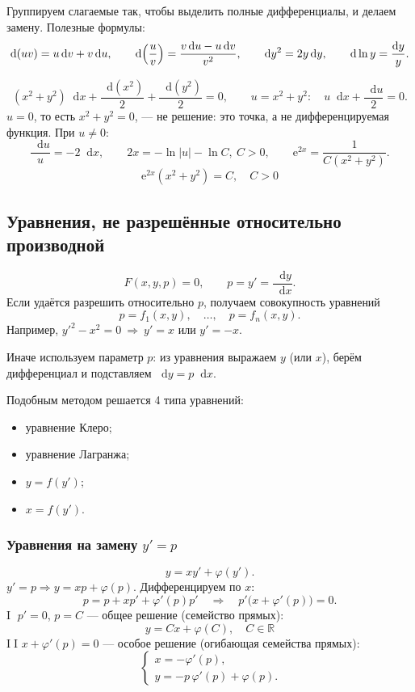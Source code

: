 \documentclass[12pt,a4paper]{article}
\numberwithin{equation}{section}
\newcommand{\R}{\mathbb{R}}
\newcommand{\e}{\mathrm{e}}
\newcommand{\dd}{\mathop{}\!\mathrm{d}}
\begin{document}
\label{box:type10}
\begin{definitionHSE}
Группируем слагаемые так, чтобы выделить полные дифференциалы, и делаем замену. Полезные формулы:
\[
\dd(uv)=u\dd v+v\dd u,\qquad
\dd\Bigl(\frac uv\Bigr)=\frac{v\dd u-u\dd v}{v^2},\qquad
\dd y^2=2y\dd y,\qquad
\dd\ln y=\frac{\dd y}{y}.
\]
\end{definitionHSE}

\begin{exampleHSE}[\((x^2+y^2+x)\dd x+y\dd y=0\)]
\[
(x^2+y^2)\dd x+\frac{\dd(x^2)}{2}+\frac{\dd(y^2)}{2}=0,\qquad u=x^2+y^2:\quad u\dd x+\frac{\dd u}{2}=0.
\]
$u=0$, то есть $x^2+y^2=0$, --- не решение: это точка, а не дифференцируемая функция. При $u\neq0$:
\[
\frac{\dd u}{u}=-2\dd x,\qquad 2x=-\ln|u|-\ln C,\ C>0,\qquad \e^{2x}=\frac{1}{C(x^2+y^2)}.
\]
\[
\boxed{\ \e^{2x}(x^2+y^2)=C,\quad C>0\ }
\]
\end{exampleHSE}

\subsection{Уравнения, не разрешённые относительно производной}

\[
F(x,y,p)=0,\qquad p=y'=\frac{\dd y}{\dd x}.
\]
Если удаётся разрешить относительно $p$, получаем совокупность уравнений
\[
p=f_1(x,y),\quad\ldots,\quad p=f_n(x,y).
\]
Например, $y'^2-x^2=0\ \Longrightarrow\ y'=x$ или $y'=-x$.

Иначе используем параметр $p$: из уравнения выражаем $y$ (или $x$), берём дифференциал и подставляем $\dd y=p\dd x$.

Подобным методом решается 4 типа уравнений:
\begin{itemize}
\item уравнение Клеро;
\item уравнение Лагранжа;
\item \(y=f(y')\);
\item \(x=f(y')\).
\end{itemize}

\subsubsection{Уравнения на замену \texorpdfstring{\(y'=p\)}{y'=p}}

\label{box:type11}
\begin{definitionHSE}
\[
y=xy'+\varphi(y').
\]
$\boxed{y'=p}\Rightarrow y=xp+\varphi(p)$. Дифференцируем по $x$:
\[
p=p+xp'+\varphi'(p)p'\quad\Longrightarrow\quad p'\bigl(x+\varphi'(p)\bigr)=0.
\]
\textcircled{\small I} $p'=0$, $p=C$ --- общее решение (семейство прямых):
\[
\boxed{\ y=Cx+\varphi(C),\quad C\in\R\ }
\]
\textcircled{\small II} $x+\varphi'(p)=0$ --- особое решение (огибающая семейства прямых):
\[
\boxed{\ \begin{cases}x=-\varphi'(p),\\ y=-p\,\varphi'(p)+\varphi(p).\end{cases}}
\]
\end{definitionHSE}
\end{document}
